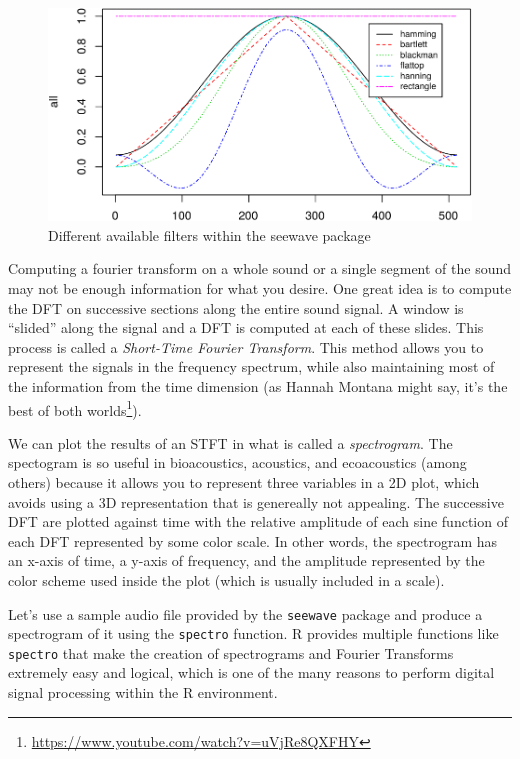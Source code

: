 \documentclass[]{krantz}
\renewcommand{\href}[2]{#2\footnote{\url{#1}}}
\begin{document}
\begin{figure}
\centering
\includegraphics{bookdown_files/figure-latex/filters-1.pdf}
\caption{\label{fig:filters}Different available filters within the seewave package}
\end{figure}

Computing a fourier transform on a whole sound or a single segment of the sound may not be enough information for what you desire. One great idea is to compute the DFT on successive sections along the entire sound signal. A window is ``slided'' along the signal and a DFT is computed at each of these slides. This process is called a \emph{Short-Time Fourier Transform}. This method allows you to represent the signals in the frequency spectrum, while also maintaining most of the information from the time dimension (as Hannah Montana might say, it's the \href{https://www.youtube.com/watch?v=uVjRe8QXFHY}{best of both worlds}).

We can plot the results of an STFT in what is called a \emph{spectrogram}. The spectogram is so useful in bioacoustics, acoustics, and ecoacoustics (among others) because it allows you to represent three variables in a 2D plot, which avoids using a 3D representation that is genereally not appealing. The successive DFT are plotted against time with the relative amplitude of each sine function of each DFT represented by some color scale. In other words, the spectrogram has an x-axis of time, a y-axis of frequency, and the amplitude represented by the color scheme used inside the plot (which is usually included in a scale).

Let's use a sample audio file provided by the \texttt{seewave} package and produce a spectrogram of it using the \texttt{spectro} function. R provides multiple functions like \texttt{spectro} that make the creation of spectrograms and Fourier Transforms extremely easy and logical, which is one of the many reasons to perform digital signal processing within the R environment.
\end{document}
